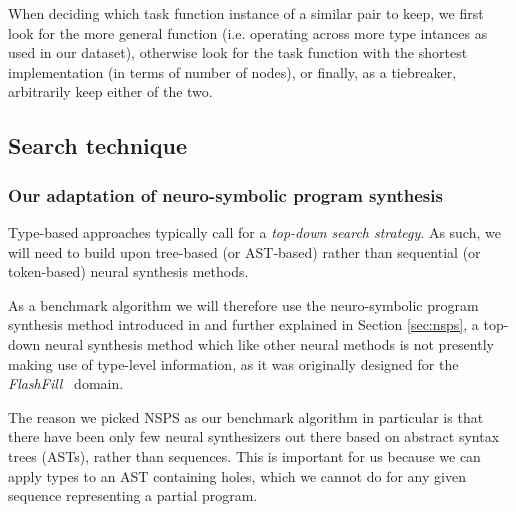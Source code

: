 \documentclass{article}
\begin{document}

When deciding which task function instance of a similar pair to keep,
we first look for the more general function (i.e. operating across more type intances as used in our dataset),
otherwise look for the task function with the shortest implementation (in terms of number of nodes),
or finally, as a tiebreaker, arbitrarily keep either of the two.

\subsection{Search technique}

\subsubsection{Our adaptation of neuro-symbolic program synthesis} \label{sec:ournsps}

Type-based approaches typically call for a \emph{top-down search strategy}.
As such, we will need to build upon tree-based (or AST-based) rather than sequential (or token-based) neural synthesis methods.

As a benchmark algorithm we will therefore use the neuro-symbolic program synthesis method introduced in \citet{nsps} and further explained in Section \ref{sec:nsps},
a top-down neural synthesis method which like other neural methods is not presently making use of type-level information,
as it was originally designed for the \emph{FlashFill}~\citep{prose} domain.

The reason we picked NSPS as our benchmark algorithm in particular is that there have been only few neural synthesizers out there based on abstract syntax trees (ASTs), rather than sequences.
This is important for us because we can apply types to an AST containing holes,
which we cannot do for any given sequence representing a partial program.


\end{document}
